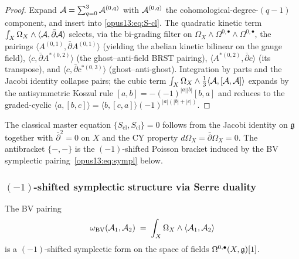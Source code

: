 \begin{proof}
Expand $\mathcal{A} = \sum_{q=0}^{3} \mathcal{A}^{(0,q)}$ with $\mathcal{A}^{(0,q)}$ the
cohomological-degree-$(q-1)$ component, and insert into
\eqref{opus13:eq:S-cl}. The quadratic kinetic term
$\int_X \Omega_X \wedge \langle \mathcal{A},\bar\partial\mathcal{A}\rangle$ selects, via
the bi-grading filter on $\Omega_X\wedge\Omega^{0,\bullet}\wedge
\Omega^{0,\bullet}$, the pairings $\langle A^{(0,1)},\bar\partial
A^{(0,1)}\rangle$ (yielding the abelian kinetic bilinear on the gauge
field), $\langle c,\bar\partial A^{*(0,2)}\rangle$ (the
ghost--anti-field BRST pairing), $\langle A^{*(0,2)},\bar\partial c
\rangle$ (its transpose), and $\langle c,\bar\partial c^{*(0,3)}\rangle$
(ghost--anti-ghost). Integration by parts and the Jacobi identity
collapse pairs; the cubic term
$\int_X \Omega_X \wedge \tfrac{1}{3}\langle\mathcal{A},[\mathcal{A},\mathcal{A}]\rangle$
expands by the antisymmetric Koszul rule
$[a,b] = -(-1)^{|a||b|}[b,a]$ and reduces to the graded-cyclic
$\langle a,[b,c]\rangle = \langle b,[c,a]\rangle(-1)^{|a|(|b|+|c|)}$.
\end{proof}

\begin{remark}\ClaimStatusRemark
\label{opus13:rem:mastereq}
The classical master equation $\{S_{\mathrm{cl}}, S_{\mathrm{cl}}\} = 0$
follows from the Jacobi identity on $\mathfrak{g}$ together with
$\bar\partial^2 = 0$ on $X$ and the CY property
$d\Omega_X = \bar\partial\Omega_X = 0$. The antibracket
$\{-,-\}$ is the $(-1)$-shifted Poisson bracket induced by the BV
symplectic pairing~\eqref{opus13:eq:sympl} below.
\end{remark}

\subsubsection{\texorpdfstring{$(-1)$-shifted symplectic structure via Serre duality}{(-1)-shifted symplectic structure via Serre duality}}

\begin{proposition}\ClaimStatusProposition
\label{opus13:prop:sympl}
The BV pairing
\begin{equation}
  \omega_{\mathrm{BV}}(\mathcal{A}_1, \mathcal{A}_2) \;=\; \int_X \Omega_X \wedge
  \langle \mathcal{A}_1, \mathcal{A}_2\rangle
  \label{opus13:eq:sympl}
\end{equation}
is a $(-1)$-shifted symplectic form on the space of fields
$\Omega^{0,\bullet}(X,\mathfrak{g})[1]$.
\end{proposition}

